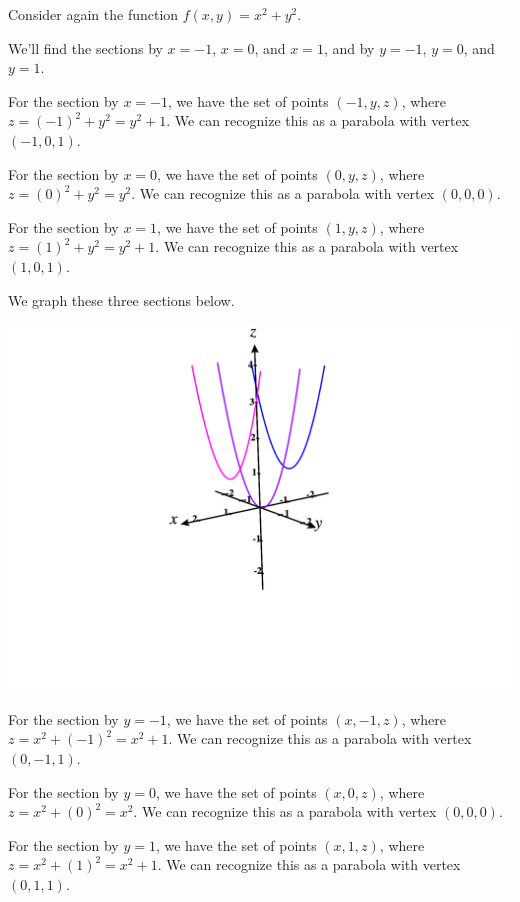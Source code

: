 \documentclass{ximera}
\begin{document}
\begin{example}
Consider again the function $f(x,y) = x^2+y^2$.

We'll find the sections by $x=-1$, $x=0$, and $x=1$, and by $y=-1$, $y=0$, and $y=1$.

For the section by $x=-1$, we have the set of points $(-1,y,z)$, where $z=(-1)^2+y^2=y^2+1$. We can recognize this as a parabola with vertex $(-1,0,1)$.

For the section by $x=0$, we have the set of points $(0,y,z)$, where $z=(0)^2+y^2=y^2$. We can recognize this as a parabola with vertex $(0,0,0)$.

For the section by $x=1$, we have the set of points $(1,y,z)$, where $z=(1)^2+y^2=y^2+1$. We can recognize this as a parabola with vertex $(1,0,1)$.

We graph these three sections below.

\begin{image}
\includegraphics[width = \textwidth]{CalcPlot3D-x_sections}
\end{image}

For the section by $y=-1$, we have the set of points $(x,-1,z)$, where $z=x^2+(-1)^2=x^2+1$. We can recognize this as a parabola with vertex $(0,-1,1)$.

For the section by $y=0$, we have the set of points $(x,0,z)$, where $z=x^2+(0)^2=x^2$. We can recognize this as a parabola with vertex $(0,0,0)$.

For the section by $y=1$, we have the set of points $(x,1,z)$, where $z=x^2+(1)^2=x^2+1$. We can recognize this as a parabola with vertex $(0,1,1)$.


\end{example}
\end{document}
